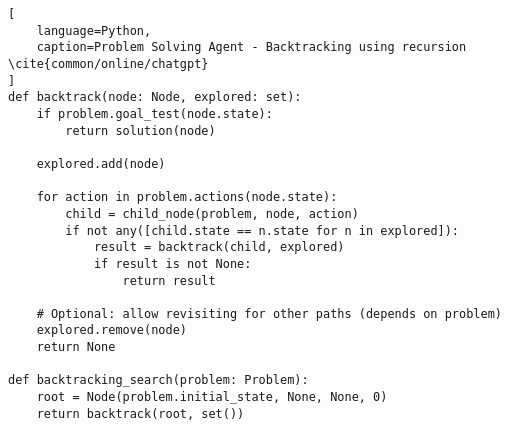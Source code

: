 \begin{lstlisting}[
    language=Python,
    caption=Problem Solving Agent - Backtracking using recursion \cite{common/online/chatgpt}
]
def backtrack(node: Node, explored: set):
    if problem.goal_test(node.state):
        return solution(node)

    explored.add(node)

    for action in problem.actions(node.state):
        child = child_node(problem, node, action)
        if not any([child.state == n.state for n in explored]):
            result = backtrack(child, explored)
            if result is not None:
                return result
    
    # Optional: allow revisiting for other paths (depends on problem)
    explored.remove(node)  
    return None

def backtracking_search(problem: Problem):
    root = Node(problem.initial_state, None, None, 0)
    return backtrack(root, set())
\end{lstlisting}














